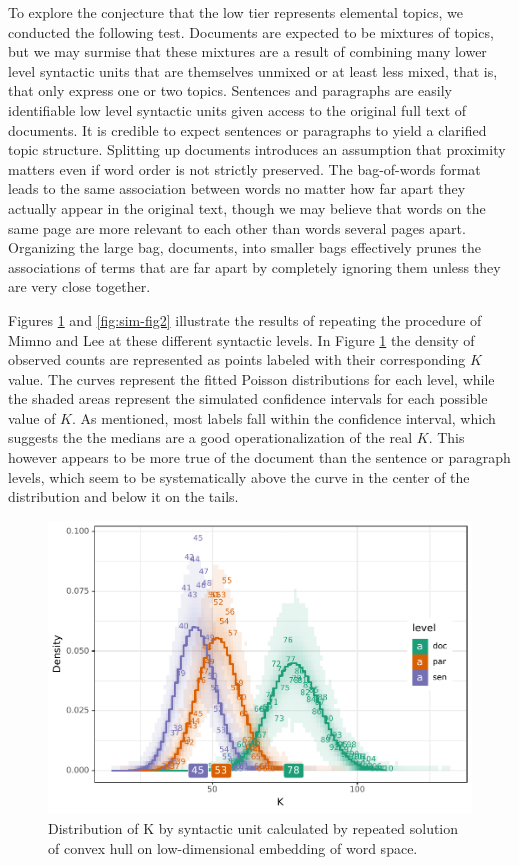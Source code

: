 \documentclass[]{book}
\theoremstyle{definition}
\theoremstyle{definition}
\theoremstyle{definition}
\theoremstyle{remark}
\begin{document}
To explore the conjecture that the low tier represents elemental topics,
we conducted the following test. Documents are expected to be mixtures
of topics, but we may surmise that these mixtures are a result of
combining many lower level syntactic units that are themselves unmixed
or at least less mixed, that is, that only express one or two topics.
Sentences and paragraphs are easily identifiable low level syntactic
units given access to the original full text of documents. It is
credible to expect sentences or paragraphs to yield a clarified topic
structure. Splitting up documents introduces an assumption that
proximity matters even if word order is not strictly preserved. The
bag-of-words format leads to the same association between words no
matter how far apart they actually appear in the original text, though
we may believe that words on the same page are more relevant to each
other than words several pages apart. Organizing the large bag,
documents, into smaller bags effectively prunes the associations of
terms that are far apart by completely ignoring them unless they are
very close together.

Figures \ref{fig:sim-fig} and \ref{fig:sim-fig2} illustrate the results
of repeating the procedure of Mimno and Lee at these different syntactic
levels. In Figure \ref{fig:sim-fig} the density of observed counts are
represented as points labeled with their corresponding \(K\) value. The
curves represent the fitted Poisson distributions for each level, while
the shaded areas represent the simulated confidence intervals for each
possible value of \(K\). As mentioned, most labels fall within the
confidence interval, which suggests the the medians are a good
operationalization of the real \(K\). This however appears to be more
true of the document than the sentence or paragraph levels, which seem
to be systematically above the curve in the center of the distribution
and below it on the tails.

\begin{figure}

{\centering \includegraphics[width=0.9\linewidth]{04_files/figure-latex/sim-fig-1} 

}

\caption{Distribution of K by syntactic unit calculated by repeated solution of convex hull on low-dimensional embedding of word space.}\label{fig:sim-fig}
\end{figure}
\end{document}

